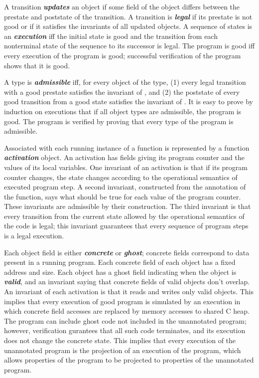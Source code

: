 \documentclass[preprint,nocopyrightspace]{sigplanconf}
\newcommand{\Def}[1]{\textit{\textbf{#1}}}
\begin{document}
A transition \Def{updates} an object if some field of the object differs
between the prestate and poststate of the transition. A transition
is \Def{legal} if its prestate is not good or if it satisfies the
invariants of all updated objects. A sequence of states is an
\Def{execution} iff the initial state
is good and the transition from each nonterminal state of the sequence
to its successor is legal. The program is good iff every execution of
the program is good; successful verification of the program shows that
it is good.

A type is \Def{admissible} iff, for every object  of the type,
(1) every legal transition with a good prestate satisfies the
invariant of , and (2) the poststate of every good transition
from a good state satisfies the invariant of . It is easy to
prove by induction on executions that if all object types are
admissible, the program is good. The program is verified by proving
that every type of the program is admissible.

Associated with each running instance of a
function is represented by a function \Def{activation} object.  An
activation has fields giving its program counter and the values of its
local variables.  One invariant of an activation is that if its
program counter changes, the state changes according to the
operational semantics of executed program step. A second invariant,
constructed from the annotation of the function, says what should be
true for each value of the program counter.  These invariants are
admissible by their construction.  The third invariant is that every
transition from the current state allowed by the operational semantics
of the code is legal; this invariant guarantees that every sequence of
program steps is a legal execution. 

Each object field is either \Def{concrete} or \Def{ghost}; concrete
fields correspond to data present in a running program. 
Each concrete field of each object has a fixed address and 
size.  Each object has a ghost field indicating when the 
object is \Def{valid}, and an invariant saying that concrete fields
of valid objects don't overlap. An invariant
of each activation is that it reads and writes only valid
objects. This implies that every execution of good program is
simulated by an execution in which concrete field accesses are replaced
by memory accesses to shared C heap. 
The program can include ghost code not included in the unannotated
program; however, verification gurantees that all such code
terminates, and its execution does not change the concrete state. 
This implies that every execution of the unannotated program is 
the projection of an execution of the program, which allows properties
of the program to be projected to properties of the unannotated
program. 
\end{document}
